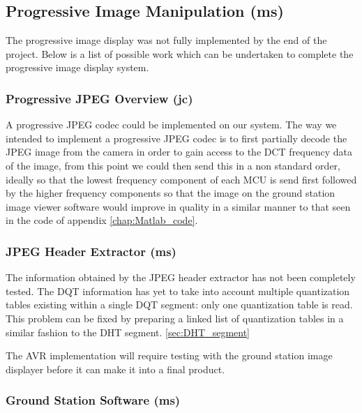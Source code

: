 
\subsection{Progressive Image Manipulation (ms)}

The progressive image display was not fully implemented by the end of the project. Below is a list of possible work which can be undertaken to complete the progressive image display system.

\subsubsection{Progressive JPEG Overview (jc)}

A progressive JPEG codec could be implemented on our system. The way we intended to implement a progressive JPEG codec is to first partially decode the JPEG image from the camera in order to gain access to the DCT frequency data of the image, from this point we could then send this in a non standard order, ideally so that the lowest frequency component of each MCU is send first followed by the higher frequency components so that the image on the ground station image viewer software would improve in quality in a similar manner to that seen in the code of appendix \ref{chap:Matlab_code}.

\subsubsection{JPEG Header Extractor (ms)}

The information obtained by the JPEG header extractor has not been completely tested. The DQT information has yet to take into account multiple quantization tables existing within a single DQT segment: only one quantization table is read. This problem can be fixed by preparing a linked list of quantization tables in a similar fashion to the DHT segment. \ref{sec:DHT_segment}

The AVR implementation will require testing with the ground station image displayer before it can make it into a final product.

\subsubsection{Ground Station Software (ms)}

